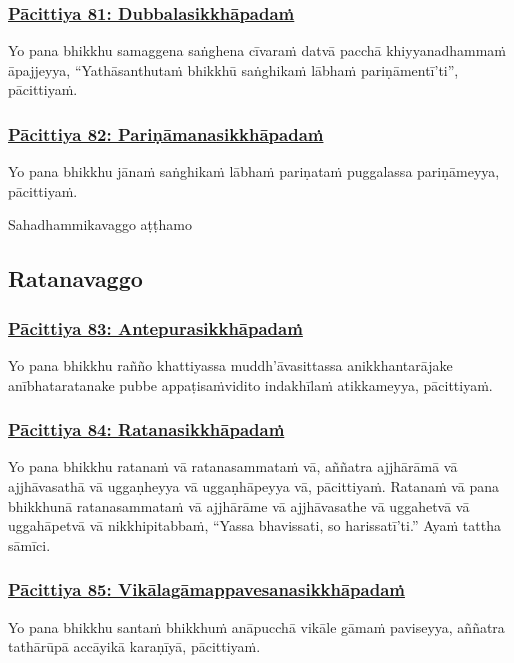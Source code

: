\subsubsection*{\hyperref[exp81]{Pācittiya 81: Dubbalasikkhāpadaṁ}}
\label{pac81}
Yo pana bhikkhu samaggena saṅghena cīvaraṁ datvā pacchā khiyyanadhammaṁ āpajjeyya, ``Yathāsanthutaṁ bhikkhū saṅghikaṁ lābhaṁ pariṇāmentī'ti'', pācittiyaṁ.

\subsubsection*{\hyperref[exp82]{Pācittiya 82: Pariṇāmanasikkhāpadaṁ}}
\label{pac82}
Yo pana bhikkhu jānaṁ saṅghikaṁ lābhaṁ pariṇataṁ puggalassa pariṇāmeyya, pācittiyaṁ.

\begin{center}
  Sahadhammikavaggo aṭṭhamo
\end{center}

\subsection{Ratanavaggo}
\vspace{0.2cm}

\subsubsection*{\hyperref[exp83]{Pācittiya 83: Antepurasikkhāpadaṁ}}
\label{pac83}
Yo pana bhikkhu rañño khattiyassa muddh'āvasittassa anikkhantarājake anībhataratanake pubbe appaṭisaṁvidito indakhīlaṁ atikkameyya, pācittiyaṁ.

\subsubsection*{\hyperref[exp84]{Pācittiya 84: Ratanasikkhāpadaṁ}}
\label{pac84}
Yo pana bhikkhu ratanaṁ vā ratanasammataṁ vā, aññatra ajjhārāmā vā ajjhāvasathā vā uggaṇheyya vā uggaṇhāpeyya vā, pācittiyaṁ. Ratanaṁ vā pana bhikkhunā ratanasammataṁ vā ajjhārāme vā ajjhāvasathe vā uggahetvā vā uggahāpetvā vā nikkhipitabbaṁ, ``Yassa bhavissati, so harissatī'ti.'' Ayaṁ tattha sāmīci.

\subsubsection*{\hyperref[exp85]{Pācittiya 85: Vikālagāmappavesanasikkhāpadaṁ}}
\label{pac85}
Yo pana bhikkhu santaṁ bhikkhuṁ anāpucchā vikāle gāmaṁ paviseyya, aññatra tathārūpā accāyikā karaṇīyā, pācittiyaṁ.

